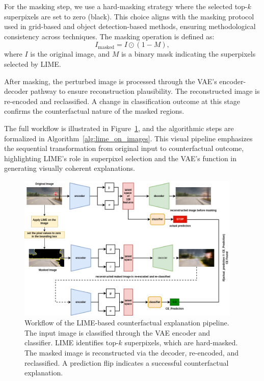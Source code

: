 For the masking step, we use a hard-masking strategy where the selected top-$k$ superpixels are set to zero (black). This choice aligns with the masking protocol used in grid-based and object detection-based methods, ensuring methodological consistency across techniques. The masking operation is defined as:
\[
I_{\text{masked}} = I \odot (1 - M),
\]
where \( I \) is the original image, and \( M \) is a binary mask indicating the superpixels selected by LIME.

After masking, the perturbed image is processed through the VAE’s encoder-decoder pathway to ensure reconstruction plausibility. The reconstructed image is re-encoded and reclassified. A change in classification outcome at this stage confirms the counterfactual nature of the masked regions.

The full workflow is illustrated in Figure~\ref{fig:lime_image_workflow}, and the algorithmic steps are formalized in Algorithm~\ref{alg:lime_on_images}. This visual pipeline emphasizes the sequential transformation from original input to counterfactual outcome, highlighting LIME’s role in superpixel selection and the VAE’s function in generating visually coherent explanations.

\begin{figure}[htbp]
    \centering
    \includegraphics[width=0.95\textwidth]{img/masking/lime_on_images/lime_on_images_based_masking_flow.drawio.png}
    \caption[Workflow of LIME-based counterfactual generation]{%
Workflow of the LIME-based counterfactual explanation pipeline. The input image is classified through the VAE encoder and classifier. LIME identifies top-$k$ superpixels, which are hard-masked. The masked image is reconstructed via the decoder, re-encoded, and reclassified. A prediction flip indicates a successful counterfactual explanation.}
    \label{fig:lime_image_workflow}
\end{figure}



